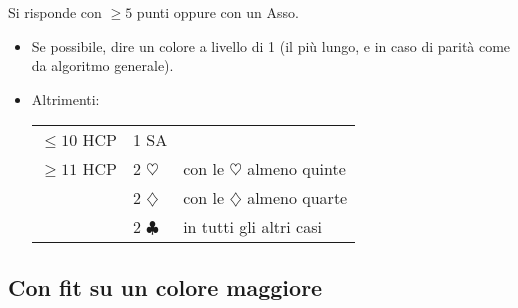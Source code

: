 \documentclass[a4paper,10pt]{article}
\renewcommand{\c}{$\clubsuit$\xspace}
\renewcommand{\d}{$\diamondsuit$\xspace}
\newcommand{\h}{$\heartsuit$\xspace}
\newcommand{\sa}{SA\xspace}
\begin{document}
Si risponde con $\geq 5$ punti oppure con un Asso.
\begin{itemize}
 \item Se possibile, dire un colore a livello di 1 (il pi\`u lungo, e in caso di parit\`a come da algoritmo generale).
 \item Altrimenti:
\begin{center}
\begin{tabular}{p{} p{} p{}}
  $\leq 10$ HCP & 1 \sa & \\
  $\geq 11$ HCP & 2 \h & con le \h almeno quinte\\
  & 2 \d & con le \d almeno quarte\\
  & 2 \c & in tutti gli altri casi\\
\end{tabular}
\end{center}
\end{itemize}

\subsection{Con fit su un colore maggiore}
\end{document}
